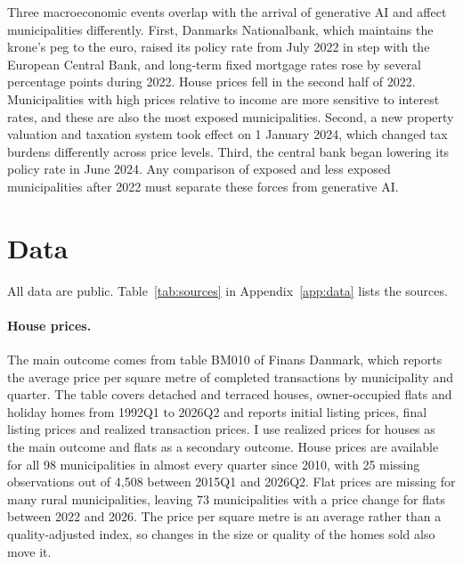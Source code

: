 \documentclass[12pt]{article}
\begin{document}
Three macroeconomic events overlap with the arrival of generative AI and affect municipalities differently. First, Danmarks Nationalbank, which maintains the krone's peg to the euro, raised its policy rate from July 2022 in step with the European Central Bank, and long-term fixed mortgage rates rose by several percentage points during 2022. House prices fell in the second half of 2022. Municipalities with high prices relative to income are more sensitive to interest rates, and these are also the most exposed municipalities. Second, a new property valuation and taxation system took effect on 1 January 2024, which changed tax burdens differently across price levels. Third, the central bank began lowering its policy rate in June 2024. Any comparison of exposed and less exposed municipalities after 2022 must separate these forces from generative AI.

\section{Data}\label{sec:data}

All data are public. Table~\ref{tab:sources} in Appendix~\ref{app:data} lists the sources.

\paragraph{House prices.} The main outcome comes from table BM010 of Finans Danmark, which reports the average price per square metre of completed transactions by municipality and quarter. The table covers detached and terraced houses, owner-occupied flats and holiday homes from 1992Q1 to 2026Q2 and reports initial listing prices, final listing prices and realized transaction prices. I use realized prices for houses as the main outcome and flats as a secondary outcome. House prices are available for all 98 municipalities in almost every quarter since 2010, with 25 missing observations out of 4,508 between 2015Q1 and 2026Q2. Flat prices are missing for many rural municipalities, leaving 73 municipalities with a price change for flats between 2022 and 2026. The price per square metre is an average rather than a quality-adjusted index, so changes in the size or quality of the homes sold also move it.
\end{document}
